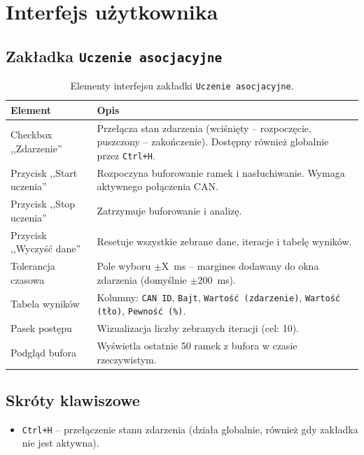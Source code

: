 \documentclass[a4paper,12pt]{article}
\begin{document}
\section{Interfejs użytkownika}

\subsection{Zakładka \texttt{Uczenie asocjacyjne}}

\begin{table}[H]
\centering
\begin{tabular}{|l|p{10cm}|}
\hline
\textbf{Element} & \textbf{Opis} \\
\hline
Checkbox ,,Zdarzenie'' & Przełącza stan zdarzenia (wciśnięty – rozpoczęcie, puszczony – zakończenie). Dostępny również globalnie przez \texttt{Ctrl+H}. \\
\hline
Przycisk ,,Start uczenia'' & Rozpoczyna buforowanie ramek i nasłuchiwanie. Wymaga aktywnego połączenia CAN. \\
\hline
Przycisk ,,Stop uczenia'' & Zatrzymuje buforowanie i analizę. \\
\hline
Przycisk ,,Wyczyść dane'' & Resetuje wszystkie zebrane dane, iteracje i tabelę wyników. \\
\hline
Tolerancja czasowa & Pole wyboru $\pm$X~ms – margines dodawany do okna zdarzenia (domyślnie $\pm200$~ms). \\
\hline
Tabela wyników & Kolumny: \texttt{CAN ID}, \texttt{Bajt}, \texttt{Wartość (zdarzenie)}, \texttt{Wartość (tło)}, \texttt{Pewność (\%)}. \\
\hline
Pasek postępu & Wizualizacja liczby zebranych iteracji (cel: 10). \\
\hline
Podgląd bufora & Wyświetla ostatnie 50 ramek z bufora w czasie rzeczywistym. \\
\hline
\end{tabular}
\caption{Elementy interfejsu zakładki \texttt{Uczenie asocjacyjne}.}
\end{table}

\subsection{Skróty klawiszowe}
\begin{itemize}[noitemsep]
    \item \texttt{Ctrl+H} – przełączenie stanu zdarzenia (działa globalnie, również gdy zakładka nie jest aktywna).
\end{itemize}
\end{document}
